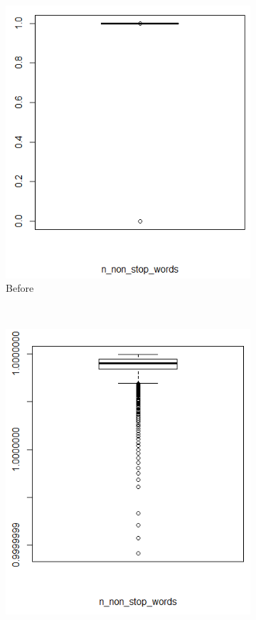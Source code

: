 \documentclass[12pt]{article}
\begin{document}
\begin{figure}[h]
    \centering
    \begin{subfigure}[h]{0.4\textwidth}
        \includegraphics[width=\textwidth]{data-c4.png}
        \caption{Before}
    \end{subfigure}
    ~ %
    \begin{subfigure}[h]{0.4\textwidth}
        \includegraphics[width=\textwidth]{data-c5.png}

\end{subfigure}
\end{figure}
\end{document}
